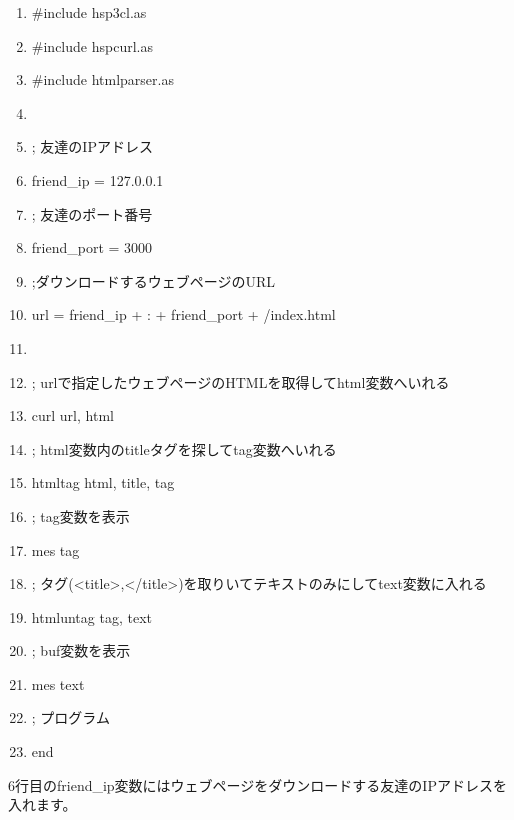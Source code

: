 \documentclass[a4paper,12pt,dvipdfmx]{jarticle}
\begin{document}
\begin{center}
\begin{boxedminipage}{16.053cm}
\setlength{\itemsep}{0cm} %
\setlength{\parskip}{0cm} %
\begin{enumerate}
\baselineskip 10pt
\setlength{\itemsep}{0cm} %
\item \#include {\textquotedbl}hsp3cl.as{\textquotedbl}
\item \#include {\textquotedbl}hspcurl.as{\textquotedbl}
\item \#include {\textquotedbl}htmlparser.as{\textquotedbl}
\item
\item ; 友達のIPアドレス
\item friend\_ip = {\textquotedbl}127.0.0.1{\textquotedbl}
\item ; 友達のポート番号
\item friend\_port = 3000
\item ;ダウンロードするウェブページのURL
\item url = friend\_ip + {\textquotedbl}:{\textquotedbl} + friend\_port + {\textquotedbl}/index.html{\textquotedbl}
\item
\item ;
urlで指定したウェブページのHTMLを取得してhtml変数へいれる
\item curl url, html
\item ;
html変数内のtitleタグを探してtag変数へいれる
\item htmltag html, {\textquotedbl}title{\textquotedbl}, tag
\item ; tag変数を表示
\item mes tag
\item ;
タグ({\textless}title{\textgreater},{\textless}/title{\textgreater})を取りいてテキストのみにしてtext変数に入れる
\item htmluntag tag, text
\item ; buf変数を表示
\item mes text
\item ; プログラム
\item end
\end{enumerate}
\end{boxedminipage}
\end{center}

\bigskip



\bigskip

6行目のfriend\_ip変数にはウェブページをダウンロードする友達のIPアドレスを入れます。
\end{document}
